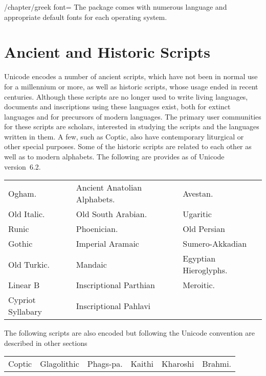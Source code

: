 \begin{key}{/chapter/greek font=}  
The package comes with numerous language and appropriate default fonts
for each operating system. 
\end{key}

\section{Ancient and Historic Scripts}

Unicode encodes a number of ancient scripts, which have not been in normal use for a millennium or more, as well as historic scripts, whose usage ended in recent centuries. Although these scripts are no longer used to write living languages, documents and inscriptions using these languages exist, both for extinct languages and for precursors of modern languages. The primary user communities for these scripts are scholars, interested in studying the scripts and the languages written in them. A few, such as Coptic, also have contemporary liturgical or other special purposes. Some of the historic scripts are related to each other as well as to modern alphabets. The following are provides as of Unicode version~6.2.

\begin{center}
\begin{tabular}{lll}
Ogham.     &Ancient Anatolian Alphabets. &Avestan.\\
Old Italic. &Old South Arabian. &Ugaritic\\
Runic &Phoenician. &Old Persian\\
Gothic &Imperial Aramaic &Sumero-Akkadian\\
Old Turkic. &Mandaic &Egyptian Hieroglyphs.\\
Linear B &Inscriptional Parthian &Meroitic.\\
Cypriot Syllabary &Inscriptional Pahlavi&\\
\end{tabular}
\end{center}

The following scripts are also encoded but following the Unicode
convention are described in other sections

\begin{center}
\begin{tabular}{llllll}
Coptic &Glagolithic &Phags-pa. &Kaithi &Kharoshi &Brahmi.\\
\end{tabular}
\end{center}


